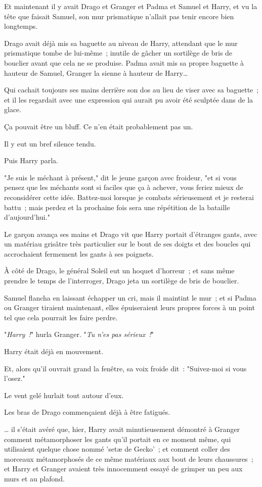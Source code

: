 Et maintenant il y avait Drago et Granger et Padma et Samuel et Harry, et vu la tête que faisait Samuel, son mur prismatique n'allait pas tenir encore bien longtemps.

Drago avait déjà mis sa baguette au niveau de Harry, attendant que le mur prismatique tombe de lui-même~; inutile de gâcher un sortilège de bris de bouclier avant que cela ne se produise. Padma avait mis sa propre baguette à hauteur de Samuel, Granger la sienne à hauteur de Harry…

Qui cachait toujours ses mains derrière son dos au lieu de viser avec sa baguette~; et il les regardait avec une expression qui aurait pu avoir été sculptée dans de la glace.

Ça pouvait être un bluff. Ce n'en était probablement pas un.

Il y eut un bref silence tendu.

Puis Harry parla.

"Je suis le méchant à présent," dit le jeune garçon avec froideur, "et si vous pensez que les méchants sont si faciles que ça à achever, vous feriez mieux de reconsidérer cette idée. Battez-moi lorsque je combats sérieusement et je resterai battu~; mais perdez et la prochaine fois sera une répétition de la bataille d'aujourd'hui."

Le garçon avança ses mains et Drago vit que Harry portait d'étranges gants, avec un matériau grisâtre très particulier sur le bout de ses doigts et des boucles qui accrochaient fermement les gants à ses poignets.

À côté de Drago, le général Soleil eut un hoquet d'horreur~; et sans même prendre le temps de l'interroger, Drago jeta un sortilège de bris de bouclier.

Samuel flancha en laissant échapper un cri, mais il maintint le mur~; et si Padma ou Granger tiraient maintenant, elles épuiseraient leurs propres forces à un point tel que cela pourrait les faire perdre.

"\emph{Harry~!}" hurla Granger. "\emph{Tu n'es pas sérieux~!}"

Harry était déjà en mouvement.

Et, alors qu'il ouvrait grand la fenêtre, sa voix froide dit~: "Suivez-moi si vous l'osez."

\later

Le vent gelé hurlait tout autour d'eux.

Les bras de Drago commençaient déjà à être fatigués.

… il s'était avéré que, hier, Harry avait minutieusement démontré à Granger comment métamorphoser les gants qu'il portait en ce moment même, qui utilisaient quelque chose nommé 'setæ de Gecko'~; et comment coller des morceaux métamorphosés de ce même matériaux aux bout de leurs chaussures~; et Harry et Granger avaient très innocemment essayé de grimper un peu aux murs et au plafond.

